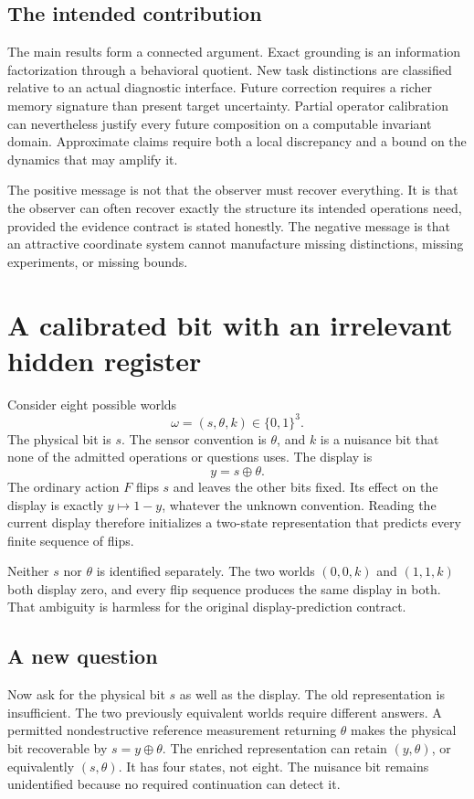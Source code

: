 \documentclass[11pt,letterpaper]{article}
\theoremstyle{plain}
\theoremstyle{definition}
\begin{document}
\subsection{The intended contribution}
The main results form a connected argument. Exact grounding is an information factorization through a behavioral quotient. New task distinctions are classified relative to an actual diagnostic interface. Future correction requires a richer memory signature than present target uncertainty. Partial operator calibration can nevertheless justify every future composition on a computable invariant domain. Approximate claims require both a local discrepancy and a bound on the dynamics that may amplify it.

The positive message is not that the observer must recover everything. It is that the observer can often recover exactly the structure its intended operations need, provided the evidence contract is stated honestly. The negative message is that an attractive coordinate system cannot manufacture missing distinctions, missing experiments, or missing bounds.

\section{A calibrated bit with an irrelevant hidden register}\label{sec:sensor}
Consider eight possible worlds
\[
\omega=(s,\theta,k)\in\{0,1\}^3.
\]
The physical bit is $s$. The sensor convention is $\theta$, and $k$ is a nuisance bit that none of the admitted operations or questions uses. The display is
\[
y=s\oplus\theta.
\]
The ordinary action $F$ flips $s$ and leaves the other bits fixed. Its effect on the display is exactly $y\mapsto1-y$, whatever the unknown convention. Reading the current display therefore initializes a two-state representation that predicts every finite sequence of flips.

Neither $s$ nor $\theta$ is identified separately. The two worlds $(0,0,k)$ and $(1,1,k)$ both display zero, and every flip sequence produces the same display in both. That ambiguity is harmless for the original display-prediction contract.

\subsection{A new question}
Now ask for the physical bit $s$ as well as the display. The old representation is insufficient. The two previously equivalent worlds require different answers. A permitted nondestructive reference measurement returning $\theta$ makes the physical bit recoverable by $s=y\oplus\theta$. The enriched representation can retain $(y,\theta)$, or equivalently $(s,\theta)$. It has four states, not eight. The nuisance bit remains unidentified because no required continuation can detect it.
\end{document}
